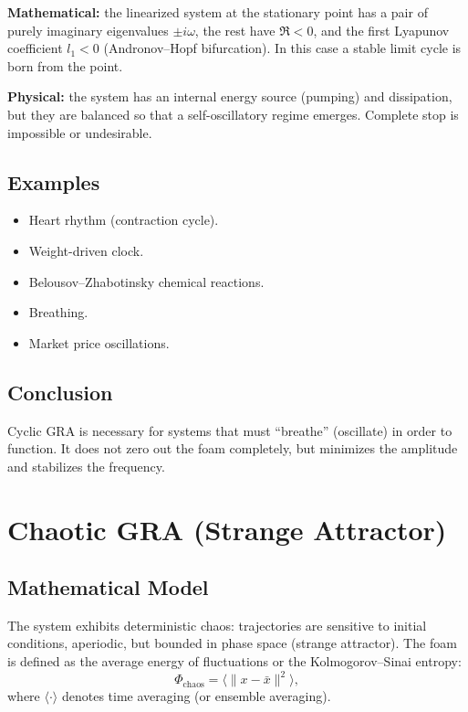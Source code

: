 \documentclass[12pt,a4paper]{article}
\begin{document}
\textbf{Mathematical:} the linearized system at the stationary point has a pair of purely imaginary eigenvalues $\pm i\omega$, the rest have $\Re < 0$, and the first Lyapunov coefficient $l_1 < 0$ (Andronov–Hopf bifurcation). In this case a stable limit cycle is born from the point.

\textbf{Physical:} the system has an internal energy source (pumping) and dissipation, but they are balanced so that a self-oscillatory regime emerges. Complete stop is impossible or undesirable.

\subsection{Examples}
\begin{itemize}
    \item Heart rhythm (contraction cycle).
    \item Weight-driven clock.
    \item Belousov–Zhabotinsky chemical reactions.
    \item Breathing.
    \item Market price oscillations.
\end{itemize}

\subsection{Conclusion}
Cyclic GRA is necessary for systems that must ``breathe'' (oscillate) in order to function. It does not zero out the foam completely, but minimizes the amplitude and stabilizes the frequency.

\section{Chaotic GRA (Strange Attractor)}
\label{sec:chaotic}

\subsection{Mathematical Model}

The system exhibits deterministic chaos: trajectories are sensitive to initial conditions, aperiodic, but bounded in phase space (strange attractor). The foam is defined as the average energy of fluctuations or the Kolmogorov–Sinai entropy:
\begin{equation}
    \Phi_{\text{chaos}} = \langle \| x - \bar{x} \|^2 \rangle,
\end{equation}
where $\langle \cdot \rangle$ denotes time averaging (or ensemble averaging).
\end{document}

